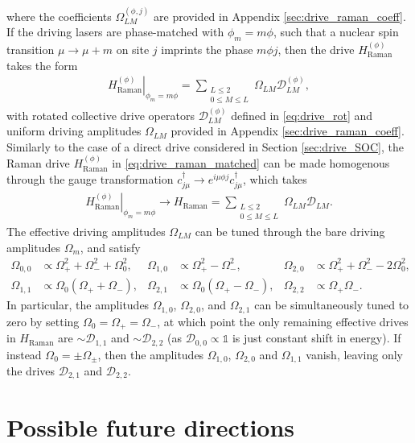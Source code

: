 \documentclass[nofootinbib,notitlepage,11pt]{revtex4-2}
\renewcommand{\t}{\text} %
\newcommand{\p}[1]{\left(#1\right)} %
\newcommand{\1}{\mathds{1}}
\newcommand{\D}{\mathcal{D}}
\begin{document}
where the coefficients $\Omega_{LM}^{(\phi,j)}$ are provided in
Appendix \ref{sec:drive_raman_coeff}.  If the driving lasers are
phase-matched with $\phi_m=m\phi$, such that a nuclear spin transition
$\mu\to\mu+m$ on site $j$ imprints the phase $m\phi j$, then the drive
$H_{\t{Raman}}^{(\phi)}$ takes the form
\begin{align}
  \left. H_{\t{Raman}}^{(\phi)} \right|_{\phi_m=m\phi}
  = \sum_{\substack{L\le2\\0\le M\le L}}
  \Omega_{LM} \D_{LM}^{(\phi)},
  \label{eq:drive_raman_matched}
\end{align}
with rotated collective drive operators $\D_{LM}^{(\phi)}$ defined in
\eqref{eq:drive_rot} and uniform driving amplitudes $\Omega_{LM}$
provided in Appendix \ref{sec:drive_raman_coeff}.  Similarly to the
case of a direct drive considered in Section \ref{sec:drive_SOC}, the
Raman drive $H_{\t{Raman}}^{(\phi)}$ in \eqref{eq:drive_raman_matched}
can be made homogenous through the gauge transformation
$c_{j\mu}^\dag \to e^{i\mu\phi j} c_{j\mu}^\dag$, which takes
\begin{align}
  \left. H_{\t{Raman}}^{(\phi)} \right|_{\phi_m=m\phi}
  \to H_{\t{Raman}}
  = \sum_{\substack{L\le2\\0\le M\le L}} \Omega_{LM} \D_{LM}.
\end{align}
The effective driving amplitudes $\Omega_{LM}$ can be tuned through
the bare driving amplitudes $\Omega_m$, and satisfy
\begin{align}
  \Omega_{0,0} &\propto \Omega_+^2 + \Omega_-^2 + \Omega_0^2,
  &
  \Omega_{1,0} &\propto \Omega_+^2 - \Omega_-^2,
  &
  \Omega_{2,0} &\propto \Omega_+^2 + \Omega_-^2 - 2\Omega_0^2,
  \\
  \Omega_{1,1} &\propto \Omega_0 \p{\Omega_+ + \Omega_-},
  &
  \Omega_{2,1} &\propto \Omega_0 \p{\Omega_+ - \Omega_-},
  &
  \Omega_{2,2} &\propto \Omega_+ \Omega_-.
\end{align}
In particular, the amplitudes $\Omega_{1,0}$, $\Omega_{2,0}$, and
$\Omega_{2,1}$ can be simultaneously tuned to zero by setting
$\Omega_0=\Omega_+=\Omega_-$, at which point the only remaining
effective drives in $H_{\t{Raman}}$ are $\sim\D_{1,1}$ and
$\sim\D_{2,2}$ (as $\D_{0,0}\propto\1$ is just constant shift in
energy).  If instead $\Omega_0=\pm\Omega_\pm$, then the amplitudes
$\Omega_{1,0}$, $\Omega_{2,0}$ and $\Omega_{1,1}$ vanish, leaving only
the drives $\D_{2,1}$ and $\D_{2,2}$.

\section{Possible future directions}
\end{document}
